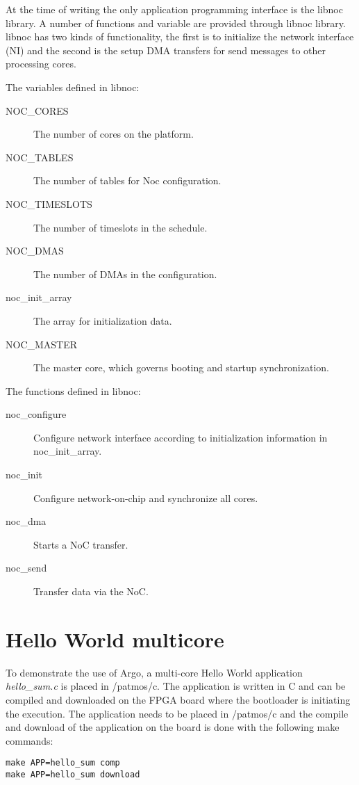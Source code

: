 \documentclass[a4paper,fontsize=10pt,twoside,DIV15,BCOR12mm,headinclude=true,footinclude=false,pagesize,bibtotoc]{scrbook}
\begin{document}
At the time of writing the only application programming interface is the libnoc library. A number of functions and variable are provided through libnoc library. libnoc has two kinds of functionality, the first is to initialize the network interface (NI) and the second is the setup DMA transfers for send messages to other processing cores. 

The variables defined in libnoc:
\begin{description}
\item[NOC\_CORES] The number of cores on the platform. 
\item[NOC\_TABLES] The number of tables for Noc configuration. 
\item[NOC\_TIMESLOTS] The number of timeslots in the schedule. 
\item[NOC\_DMAS]	The number of DMAs in the configuration. 
\item[noc\_init\_array] The array for initialization data. 
\item[NOC\_MASTER] The master core, which governs booting and startup synchronization. 
\end{description}


The functions defined in libnoc:
\begin{description}
\item [noc\_configure] Configure network interface according to initialization information in noc\_init\_array.
\item [noc\_init] Configure network-on-chip and synchronize all cores. 
\item [noc\_dma] Starts a NoC transfer. 
\item [noc\_send] Transfer data via the NoC. 
\end{description}


\section{Hello World multicore}

To demonstrate the use of Argo, a multi-core Hello World application \textit{hello\_sum.c} is placed in /patmos/c. The application is written in C and can be compiled and downloaded on the FPGA board where the bootloader is initiating the execution. The application needs to be placed in /patmos/c and the compile and download of the application on the board is done with the following make commands:

\begin{verbatim}
make APP=hello_sum comp
make APP=hello_sum download
\end{verbatim}
\end{document}
